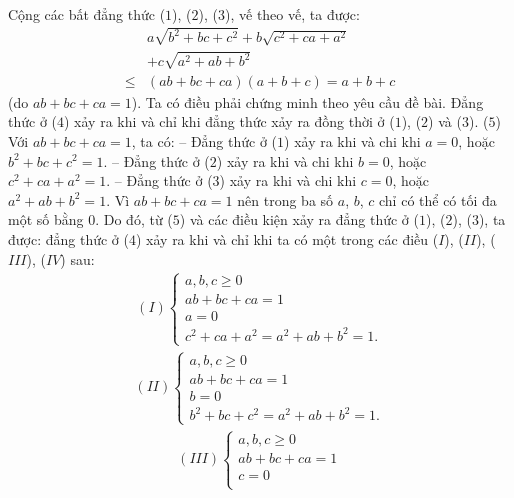 \begin{multicols}{2}
\begin{align*}
	\end{align*}
	Cộng các bất đẳng thức ($1$), ($2$), ($3$), vế theo vế, ta được:
	\begin{align*}
		&a\sqrt {{b^2} + bc + {c^2}}  + b\sqrt {{c^2} + ca + {a^2}}  \\
		&+ c\sqrt {{a^2} + ab + {b^2}}  \\
		\le &\left( {ab \!+\! bc \!+\! ca} \right)\!\left( {a \!+\! b \!+\! c} \right) \!=\! a \!+\! b \!+\! c \tag{$4$}
	\end{align*}
	(do $ab + bc + ca = 1$).
	\vskip 0.05cm
	Ta có điều phải chứng minh theo yêu cầu đề bài.
	\vskip 0.05cm
	Đẳng thức ở ($4$) xảy ra khi và chỉ khi đẳng thức xảy ra đồng thời ở ($1$), ($2$) và ($3$).                    \hfill ($5$)
	\vskip 0.05cm
	Với $ab + bc + ca = 1$, ta có:
	\vskip 0.05cm
	-- Đẳng thức ở ($1$) xảy ra khi và chi khi $a = 0$, hoặc $b^2 + bc + c^2 = 1$. 
	\vskip 0.05cm 
	-- Đẳng thức ở ($2$) xảy ra khi và chi khi $b = 0$, hoặc  $c^2 + ca + a^2 = 1$.
	\vskip 0.05cm
	-- Đẳng thức ở ($3$) xảy ra khi và chi khi $c = 0$, hoặc  $a^2 + ab + b^2 = 1$.
	\vskip 0.05cm
	Vì $ab + bc + ca = 1$ nên trong ba số $a$, $b$, $c$ chỉ có thể có tối đa một số bằng $0$. Do đó, từ ($5$) và các điều kiện xảy ra đẳng thức ở ($1$), ($2$), ($3$), ta được: đẳng thức ở ($4$) xảy ra khi và chỉ khi ta có một trong các điều ($I$), ($II$), ($III$), ($IV$) sau:
	\begin{align*}
		(I)\begin{cases}
			a,b,c \ge 0\\[-0.4ex]
			ab + bc + ca = 1\\[-0.4ex] 
			a = 0\\[-0.4ex]
			{c^2} + ca + {a^2} = {a^2} + ab + {b^2} = 1.
		\end{cases}
	\end{align*}
	\begin{align*}
		(II)\begin{cases}
			a,b,c \ge 0\\[-0.4ex]
			ab + bc + ca = 1\\[-0.4ex]
			b = 0\\[-0.4ex]
			{b^2} + bc + {c^2} = {a^2} + ab + {b^2} = 1.
		\end{cases}
	\end{align*}
	\begin{align*}
		(III)\begin{cases}
			a,b,c \ge 0\\[-0.4ex]
			ab + bc + ca = 1\\[-0.4ex]
			c = 0\\[-0.4ex]

\end{cases}
\end{align*}
\end{multicols}
